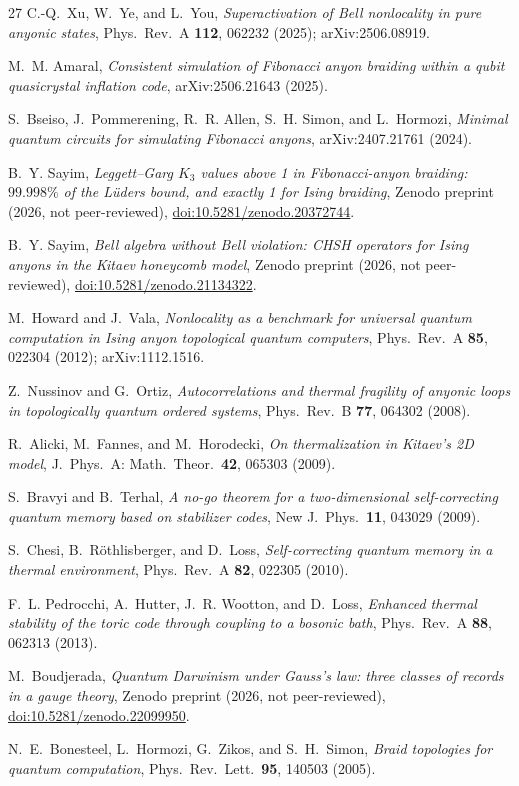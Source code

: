 \documentclass[aps,pra,twocolumn,superscriptaddress,showpacs,floatfix]{revtex4-2}
\begin{document}
\begin{thebibliography}{27}
C.-Q.~Xu, W.~Ye, and L.~You,
\emph{Superactivation of Bell nonlocality in pure anyonic states},
Phys.\ Rev.\ A \textbf{112}, 062232 (2025);
arXiv:2506.08919.

M.~M. Amaral,
\emph{Consistent simulation of Fibonacci anyon braiding within a qubit quasicrystal inflation code},
arXiv:2506.21643 (2025).

S.~Bseiso, J.~Pommerening, R.~R. Allen, S.~H. Simon, and L.~Hormozi,
\emph{Minimal quantum circuits for simulating Fibonacci anyons},
arXiv:2407.21761 (2024).

B.~Y. Sayim,
\emph{Leggett--Garg $K_{3}$ values above 1 in Fibonacci-anyon braiding:
$99.998\%$ of the L\"uders bound, and exactly 1 for Ising braiding},
Zenodo preprint (2026, not peer-reviewed),
\href{https://doi.org/10.5281/zenodo.20372744}{doi:10.5281/zenodo.20372744}.

B.~Y. Sayim,
\emph{Bell algebra without Bell violation: CHSH operators for Ising anyons
in the Kitaev honeycomb model},
Zenodo preprint (2026, not peer-reviewed),
\href{https://doi.org/10.5281/zenodo.21134322}{doi:10.5281/zenodo.21134322}.

M.~Howard and J.~Vala,
\emph{Nonlocality as a benchmark for universal quantum computation in Ising anyon topological quantum computers},
Phys.\ Rev.\ A \textbf{85}, 022304 (2012);
arXiv:1112.1516.

Z.~Nussinov and G.~Ortiz,
\emph{Autocorrelations and thermal fragility of anyonic loops in topologically
quantum ordered systems},
Phys.\ Rev.\ B \textbf{77}, 064302 (2008).

R.~Alicki, M.~Fannes, and M.~Horodecki,
\emph{On thermalization in Kitaev's 2D model},
J.\ Phys.\ A: Math.\ Theor.\ \textbf{42}, 065303 (2009).

S.~Bravyi and B.~Terhal,
\emph{A no-go theorem for a two-dimensional self-correcting quantum memory
based on stabilizer codes},
New J.\ Phys.\ \textbf{11}, 043029 (2009).

S.~Chesi, B.~R\"othlisberger, and D.~Loss,
\emph{Self-correcting quantum memory in a thermal environment},
Phys.\ Rev.\ A \textbf{82}, 022305 (2010).

F.~L. Pedrocchi, A.~Hutter, J.~R. Wootton, and D.~Loss,
\emph{Enhanced thermal stability of the toric code through coupling to a
bosonic bath},
Phys.\ Rev.\ A \textbf{88}, 062313 (2013).

M.~Boudjerada,
\emph{Quantum Darwinism under Gauss's law: three classes of records in a gauge
theory},
Zenodo preprint (2026, not peer-reviewed),
\href{https://doi.org/10.5281/zenodo.22099950}{doi:10.5281/zenodo.22099950}.

N.~E.~Bonesteel, L.~Hormozi, G.~Zikos, and S.~H.~Simon,
\emph{Braid topologies for quantum computation},
Phys.\ Rev.\ Lett.\ \textbf{95}, 140503 (2005).

\end{thebibliography}
\end{document}
